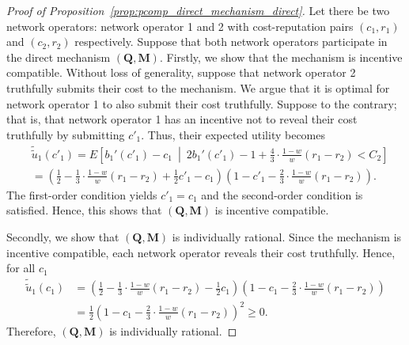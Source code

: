\begin{proof}[Proof of Proposition~\ref{prop:pcomp_direct_mechanism_direct}]
Let there be two network operators: network operator 1 and 2 with cost-reputation pairs $(c_1,r_1)$ and $(c_2,r_2)$ respectively. Suppose that both network operators participate in the direct mechanism $(\mathbf{Q},\mathbf{M})$. Firstly, we show that the mechanism is incentive compatible. Without loss of generality, suppose that network operator 2 truthfully submits their cost to the mechanism. We argue that it is optimal for network operator 1 to also submit their cost truthfully. Suppose to the contrary; that is, that network operator 1 has an incentive not to reveal their cost truthfully by submitting $c'_1$. Thus, their expected utility becomes
\begin{align*}
	&\tilde{\tilde{u}}_1(c'_1) = E\left[ b_1'(c'_1) - c_1 \:\middle\vert\: 2b_1'(c'_1) - 1 + \frac{4}{3}\cdot\frac{1-w}{w}(r_1-r_2) < C_2 \right] \\
	&= \left(\frac{1}{2} - \frac{1}{3}\cdot\frac{1-w}{w}(r_1-r_2) + \frac{1}{2}c'_1 - c_1 \right)\left(1 - c'_1 - \frac{2}{3}\cdot\frac{1-w}{w}(r_1-r_2)\right).
\end{align*}
The first-order condition yields $c'_1 = c_1$ and the second-order condition is satisfied. Hence, this shows that $(\mathbf{Q},\mathbf{M})$ is incentive compatible.

Secondly, we show that $(\mathbf{Q},\mathbf{M})$ is individually rational. Since the mechanism is incentive compatible, each network operator reveals their cost truthfully. Hence, for all $c_1$
\begin{align*}
	\tilde{\tilde{u}}_1(c_1) &= \left(\frac{1}{2} - \frac{1}{3}\cdot\frac{1-w}{w}(r_1-r_2) - \frac{1}{2}c_1 \right)\left(1 - c_1 - \frac{2}{3}\cdot\frac{1-w}{w}(r_1-r_2)\right)\\
	&= \frac{1}{2}\left( 1 - c_1 - \frac{2}{3}\cdot\frac{1-w}{w}(r_1-r_2) \right)^2 \ge 0.
\end{align*}
Therefore, $(\mathbf{Q},\mathbf{M})$ is individually rational.
\end{proof}

